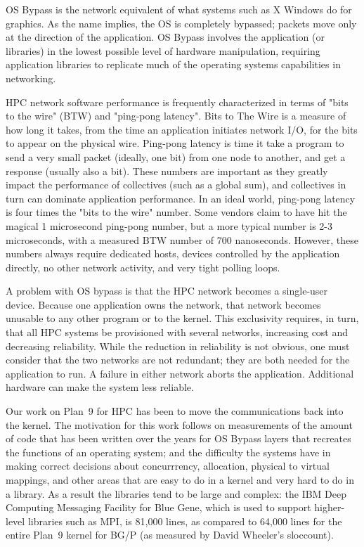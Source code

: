 \documentclass[letterpaper,twocolumn,10pt]{article}
\begin{document}
OS Bypass is the network equivalent of what systems such as X Windows do for graphics. 
As the name implies, the OS is completely bypassed; packets move only at the 
direction of the application. OS Bypass involves the application (or libraries) in the
lowest possible level of hardware manipulation, requiring
application libraries to replicate much of the operating systems
capabilities in networking. 

HPC network software performance is frequently characterized in terms of "bits to the wire" (BTW) and "ping-pong latency". 
Bits to The Wire is a measure of how long it takes, 
from the time an application initiates
network I/O, for the bits to appear on the physical wire. Ping-pong latency 
is time it take a program to send a very small packet (ideally, one bit) from 
one node to another, and get a response (usually also a bit). 
These numbers are important as they greatly impact the performance of collectives (such as a global sum), 
and collectives in turn can dominate application performance\cite{petrini}\cite{ 10.1109/HPC.1997.592137}\cite{quadrics}.
In an ideal world, ping-pong latency is four times the "bits to the wire" number. 
Some vendors claim to have hit the magical 1 microsecond ping-pong number, but a more typical 
number is 2-3 microseconds, with a measured BTW number of 700 nanoseconds. 
However, these numbers always require dedicated hosts, devices
controlled by the application directly, no other network activity, 
and very tight polling loops. 

A problem with OS bypass is that the HPC network becomes a single-user device. Because one application 
owns the network, that network becomes unusable to any other program or to the kernel. This exclusivity requires, in turn, that all
HPC systems be provisioned with several networks, increasing cost and decreasing reliability. While the reduction in reliability is not obvious, one must consider 
that the two networks are not redundant; they are both needed for the application
to run. A failure in either network aborts the application. Additional hardware can make the system less reliable. 

Our work on Plan~9 for HPC has been to move the communications back into the kernel. The motivation 
for this work follows on measurements of the amount of  code that has been written over the years for OS Bypass layers that recreates the functions of an operating system; 
and the difficulty the systems have in making correct decisions about concurrrency, allocation, physical to virtual mappings, and other 
areas that are easy to do in a kernel and very hard to do in a library. As a result the libraries tend to be large and complex: the IBM Deep Computing Messaging Facility for Blue Gene, which is used to support
higher-level libraries such as MPI, is 81,000 lines, as compared to 64,000 lines for the entire Plan~9 kernel  for BG/P (as measured by David Wheeler's sloccount). 
\end{document}
